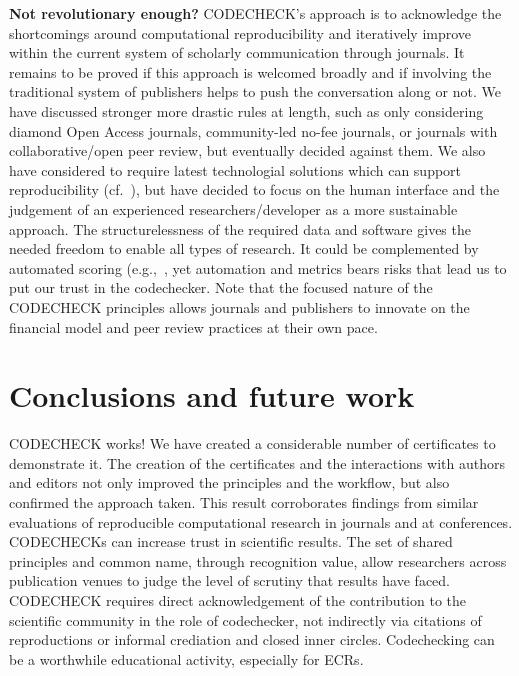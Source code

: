 \documentclass[12pt]{article}
\begin{document}
\textbf{Not revolutionary enough?}
CODECHECK's approach is to acknowledge the shortcomings around 
computational reproducibility and iteratively improve within the current
system of scholarly communication through journals.
It remains to be proved if this approach is welcomed broadly and if 
involving the traditional system of publishers helps to push the 
conversation along or not.
We have discussed stronger more drastic rules at length, such as only 
considering diamond Open Access journals, community-led no-fee journals,
or journals with collaborative/open peer review, but eventually decided
against them.
We also have considered to require latest technologial solutions which can
support reproducibility (cf.~\cite{konkol_publishing_2020}), but have 
decided to focus on the human interface and the judgement of an experienced
researchers/developer as a more sustainable approach.
The structurelessness of the required data and software gives the needed
freedom to enable all types of research. It could be complemented by
automated scoring (e.g.,~\cite{menke_rigor_2020}, yet automation and 
metrics bears risks that lead us to put our trust in the codechecker.
Note that the focused nature of the CODECHECK principles allows journals
and publishers to innovate on the financial model and peer review practices
at their own pace.

\section*{Conclusions and future work}\label{future-work-and-conclusions}

CODECHECK works!
We have created a considerable number of certificates to demonstrate it.
The creation of the certificates and the interactions with authors and
editors not only improved the principles and the workflow, but also
confirmed the approach taken. This result corroborates findings from
similar evaluations of reproducible computational research in journals and
at conferences.
CODECHECKs can increase trust in scientific results.
The set of 
shared principles and common name, through recognition value,
allow researchers
across publication venues to judge the level of scrutiny that results have
faced. CODECHECK requires direct acknowledgement of the contribution to the
scientific community in the role of codechecker, not indirectly via citations 
of reproductions or informal crediation and closed inner circles.
Codechecking can be a worthwhile educational activity, especially for
ECRs.
\end{document}
